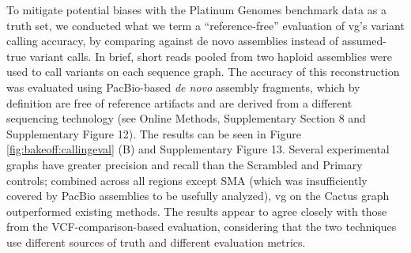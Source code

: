 To mitigate potential biases with the Platinum Genomes benchmark data as
a truth set\cite{Eberle2016-zc}, we conducted what we term a
``reference-free'' evaluation of vg's variant calling accuracy, by
comparing against de novo assemblies instead of assumed-true variant
calls. In brief, short reads pooled from two haploid assemblies were
used to call variants on each sequence graph. The accuracy of this
reconstruction was evaluated using PacBio-based \emph{de novo} assembly
fragments, which by definition are free of reference artifacts and are
derived from a different sequencing technology (see Online Methods,
Supplementary Section 8 and Supplementary Figure 12). The results can be
seen in Figure \ref{fig:bakeoff:callingeval} (B) and Supplementary Figure 13. Several experimental
graphs have greater precision and recall than the Scrambled and Primary
controls; combined across all regions except SMA (which was
insufficiently covered by PacBio assemblies to be usefully analyzed), vg
on the Cactus graph outperformed existing methods. The results appear to
agree closely with those from the VCF-comparison-based evaluation,
considering that the two techniques use different sources of truth and
different evaluation metrics.

